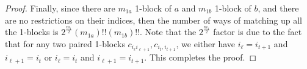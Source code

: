 \documentclass[11pt,reqno]{amsart}
\numberwithin{equation}{section}
\theoremstyle{plain}
\newtheorem{lemma}[thm]{Lemma}
\begin{document}
\begin{proof}
Finally, since there are $m_{1a}$ 1-block of $a$ and $m_{1b}$ 1-block of $b$, and there are no restrictions on their indices, then the number of ways of matching up all the 1-blocks is $2^{\frac{m_1}{2}}(m_{1a})!!(m_{1b})!!$. Note that the $2^{\frac{m_1}{2}}$ factor is due to the fact that for any two paired 1-blocks $c_{i_\ell i_{\ell+1}}, c_{i_t, i_{t+1}}$, we either have $i_\ell=i_{t+1}$ and $i_{\ell+1}=i_t$ or $i_{\ell}=i_t$ and $i_{\ell+1}=i_{t+1}$. This completes the proof.
\end{proof}




\end{document}
